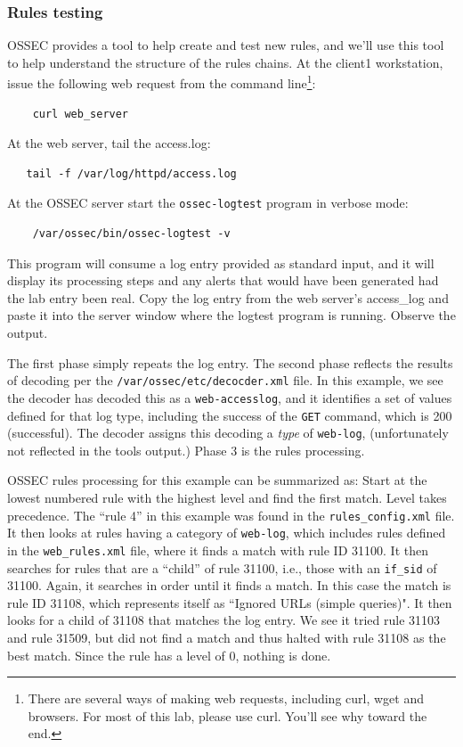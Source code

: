 \subsubsection{Rules testing}
OSSEC provides a tool to help create and test new rules, and we'll use this tool to help understand the structure
of the rules chains.  At the client1 workstation, issue the following web request from the command line\footnote{There
are several ways of making web requests, including curl, wget and browsers.  For most of this lab, please use curl.
You'll see why toward the end.}:
\begin{verbatim}
    curl web_server
\end{verbatim}
\noindent At the web server, tail the access.log:
\begin{verbatim}
   tail -f /var/log/httpd/access.log
\end{verbatim}
\noindent At the OSSEC server start the {\tt ossec-logtest} program in verbose mode:
\begin{verbatim}
    /var/ossec/bin/ossec-logtest -v
\end{verbatim}
\noindent  This program will consume a log entry provided as standard input, and it will display its processing
steps and any alerts that would have been generated had the lab entry been real.  Copy the log entry from the web server's
access\_log and paste it into the server window where the logtest program is running.  Observe the output.

The first phase simply repeats the log entry.   The second phase reflects the results of decoding per the {\tt /var/ossec/etc/decocder.xml} file.  In this example, we
see the decoder has decoded this as a {\tt web-accesslog}, and it identifies a set of values defined for that log type,
including the success of the {\tt GET} command, which is 200 (successful).  The decoder assigns this decoding a
\textit{type} of {\tt web-log}, (unfortunately not reflected in the tools output.)   Phase 3 is the rules processing.

OSSEC rules processing for this example can be summarized 
as:  Start at the lowest numbered rule with the highest level and find the first match. Level takes precedence. The ``rule 4''
in this example was found in the {\tt rules\_config.xml} file.  It then looks at rules having a category of 
{\tt web-log}, which includes rules defined in the {\tt web\_rules.xml} file, where it finds a match with rule ID 
31100.  It then searches for rules that are a ``child'' of rule 31100, i.e., those with an {\tt if\_sid} of 31100.
Again, it searches in order until it finds a match.  In this case the match is rule ID 31108, which represents itself
as ``Ignored URLs (simple queries)".  It then looks for a child of 31108 that matches the log entry.  We see it
tried rule 31103 and rule 31509, but did not find a match and thus halted with rule 31108 as the best match.
Since the rule has a level of 0, nothing is done.

